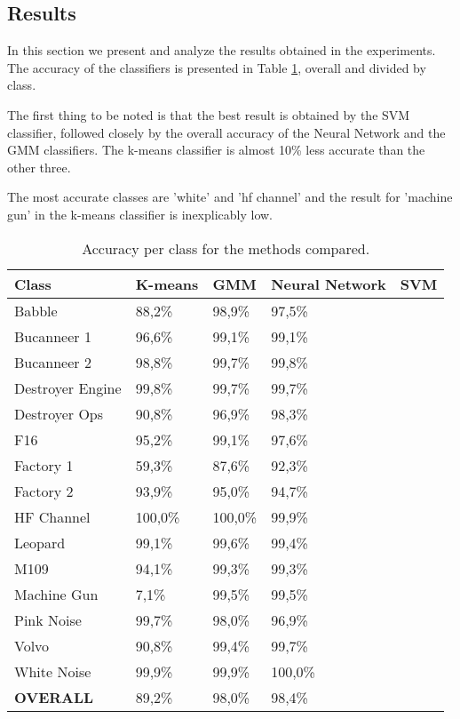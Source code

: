 \documentclass[12pt]{article}
\begin{document}
\subsection{Results} \label{exp:res}


In this section we present and analyze the results obtained in the experiments. The accuracy of the classifiers is presented in Table \ref{tab:acc}, overall and divided by class.

The first thing to be noted is that the best result is obtained by the SVM classifier, followed closely by the overall accuracy of the Neural Network and the GMM classifiers. The k-means classifier is almost 10\% less accurate than the other three.

The most accurate classes are 'white' and 'hf channel' and the result for 'machine gun' in the k-means classifier is inexplicably low.

\begin{table}[ht]
\centering
\caption{Accuracy per class for the methods compared.}
\label{tab:acc}
\begin{tabular}{l|llll}
\hline
Class & K-means & GMM & Neural Network & SVM \\
\hline
Babble & 88,2\% & 98,9\% & 97,5\% &  \\
Bucanneer 1 & 96,6\% & 99,1\% & 99,1\% & \\
Bucanneer 2 & 98,8\% & 99,7\% & 99,8\% & \\
Destroyer Engine & 99,8\% & 99,7\% & 99,7\% & \\
Destroyer Ops & 90,8\% & 96,9\% & 98,3\% & \\
F16 & 95,2\% & 99,1\% & 97,6\% & \\
Factory 1 & 59,3\% & 87,6\% & 92,3\% & \\
Factory 2 & 93,9\% & 95,0\% & 94,7\% & \\
HF Channel & 100,0\% & 100,0\% & 99,9\% & \\
Leopard & 99,1\% & 99,6\% & 99,4\% & \\
M109 & 94,1\% & 99,3\% & 99,3\% & \\
Machine Gun & 7,1\% & 99,5\% & 99,5\% & \\
Pink Noise & 99,7\% & 98,0\% & 96,9\% & \\
Volvo & 90,8\% & 99,4\% & 99,7\% & \\
White Noise & 99,9\% & 99,9\% & 100,0\% & \\
\hline
\textbf{OVERALL} & 89,2\% & 98,0\% & 98,4\% & \\
\hline
\end{tabular}
\end{table}
\end{document}
